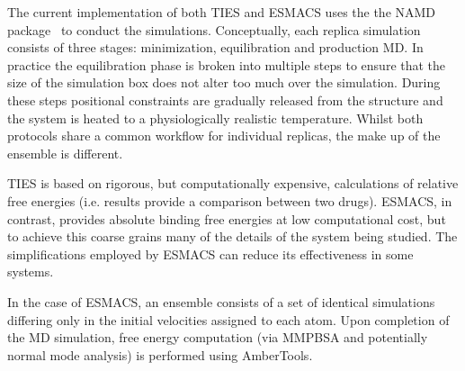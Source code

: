
The current implementation of both TIES and ESMACS uses the the NAMD package~\cite{Phillips2005} to conduct the simulations. Conceptually, each replica simulation consists of three stages: minimization, equilibration and production MD. In practice the equilibration phase is broken into multiple steps to ensure that the size of the simulation box does not alter too much over the simulation. During these steps positional constraints are gradually released from the structure and the system is heated to a physiologically realistic temperature. Whilst both protocols share a common workflow for individual replicas, the make up of the ensemble is different.


TIES is based on rigorous, but computationally expensive, calculations of relative free energies (i.e. results provide a comparison between two drugs). ESMACS, in contrast, provides absolute binding free energies at low computational cost, but to achieve this coarse grains many of the details of the system being studied. The simplifications employed by ESMACS can reduce its effectiveness in some systems. 


In the case of ESMACS, an ensemble consists of a set of identical simulations  differing only in the initial velocities assigned to each atom. Upon completion of the MD simulation, free energy computation (via MMPBSA and potentially normal mode analysis) is performed using AmberTools.



